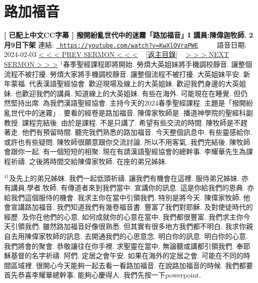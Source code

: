 \documentclass{book}
\begin{document}
\section{路加福音}
\label{sec:KwXlOVraPWE}
\textbf{[ 已配上中文CC字幕 ] 撥開紛亂世代中的迷霧「路加福音」I  講員:陳偉迦牧師. 2月9日下架}
\newline
\newline
連結: \href{https://youtube.com/watch?v=KwXlOVraPWE}{\texttt{ https://youtube.com/watch?v=KwXlOVraPWE}} ~~~~ 語音日期: 2024-02-03 
\newline
\newline
\hyperref[sec:5AhQhWw7knY]{\small{< < < PREV SERMON < < <}}
~
\hyperref[sec:index]{\small{[返主目錄]}}
~
\hyperref[sec:y7RfxilxFdE]{\small{> > > NEXT SERMON > > >}}
\newline
\newline
$^{1}$春季聖經課程即將開始.
勞煩大英姐妹將手機調校靜音.
讓整個流程不被打擾.
勞煩大家將手機調校靜音.
讓整個流程不被打擾.
大英姐妹平安.
新年蒙福.
代表漢語聖經協會.
歡迎現場及線上的大英姐妹.
歡迎我們身邊的大英姐妹.
也歡迎我們的講員.
知道線上的大英姐妹.
有些在海外.
可能現在在睡覺.
但仍然堅持出席.
為我們漢語聖經協會.
主持今天的2024春季聖經課程.
主題是「撥開紛亂世代中的迷霧」.
要看的經卷是路加福音.
陳偉家牧師是.
播道神學院的聖經科副教授.
課程完結後.
由於是課程.
不是只講了.
希望有些交流的時間.
陳牧師是不趕著走.
他們有預留時間.
聽完我們熟悉的路加福音.
今天整個訊息中.
有些靈感給你.
或許也有些疑問.
陳牧師很願意跟你交流討論.
所以不用客氣.
我們完結後.
陳牧師會跟你一起.
有一個短短的相聚.
現在有請漢語聖經協會的總幹事.
李耀華先生為課程祈禱.
之後將時間交給陳偉家牧師.
在座的弟兄姊妹.

$^{41}$及先上的弟兄姊妹.
我們一起低頭祈禱.
讓我們有機會在這裡.
服侍弟兄姊妹.
亦有講員,學者,牧師.
有傳道者來到我們當中.
宣講你的訊息.
這是你給我們的恩典.
亦給我們這個服侍的機會.
我求主你在當中引領我們.
特別是將今天.
陳偉家牧師.
他會宣講路加福音.
我們知道我們有幾卷福音書.
豐富了我們對耶穌.
及對使徒時代的經歷.
及你在他們的心意.
如何成就你的心意在當中.
我們都很豐富.
我們求主你今天引領我們.
雖然路加福音好像很熟悉.
但其實有很多地方我們都不明白.
我求你親自去用陳偉家牧師的訊息.
去開通我們的心思意念.
明白你的訊息.
明白你的心意.
我們將會的聚會.
恭敬讓往在你手裡.
求聖靈在當中.
無論聽或講都引領我們.
奉耶穌基督的名字祈禱.
阿們.
定居之會午安.
如果在海外的定居之會.
可能在不同的時間區域裡.
很開心今天能夠一起去看一看路加福音.
在說路加福音的時候.
我們都要首先恭喜李耀華總幹事.
能夠心慶得人.
我們先按一下powerpoint.
\end{document}
